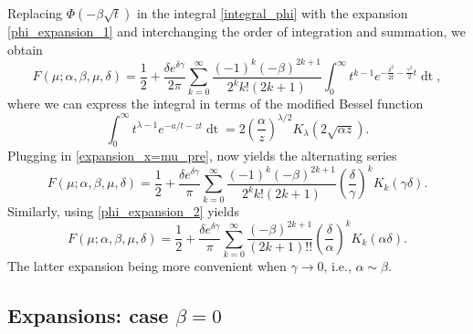 \documentclass[10pt,a4paper,oneside]{article}
\numberwithin{equation}{section}
\begin{document}
Replacing $\Phi(-\beta\sqrt{t})$ in the integral \eqref{integral_phi} with the expansion \eqref{phi_expansion_1} and interchanging the order of integration and summation, we obtain
\begin{equation}\label{expansion_x=mu_pre}
F(\mu; \alpha, \beta, \mu, \delta) = \frac{1}{2} + \frac{\delta e^{\delta \gamma}}{2\pi}\sum_{k=0}^{\infty}\frac{(-1)^k (-\beta)^{2k+1}}{2^k k! (2k+1)} \int_0^{\infty} t^{k - 1} e^{-\frac{\delta^2}{2t} - \frac{\gamma^2}{2}t} \mathop{dt},
\end{equation}
where we can express the integral in terms of the modified Bessel function
\begin{equation}\label{bessel_integral}
\int_0^{\infty} t^{\lambda - 1}e^{-a/t - zt} \mathop{dt} = 2\left(\frac{\alpha}{z}\right)^{\lambda/2} K_{\lambda}(2\sqrt{\alpha z}).
\end{equation}
Plugging in \eqref{expansion_x=mu_pre}, now yields the alternating series
\begin{equation}\label{series_x=mu_1}
F(\mu; \alpha, \beta, \mu, \delta) = \frac{1}{2} + \frac{\delta e^{\delta \gamma}}{\pi} \sum_{k=0}^{\infty} \frac{(-1)^k (-\beta)^{2k+1}}{2^k k! (2k + 1)} \left(\frac{\delta}{\gamma}\right)^k K_k(\gamma \delta).
\end{equation}
Similarly, using \eqref{phi_expansion_2} yields
\begin{equation}\label{series_x=mu_2}
F(\mu; \alpha, \beta, \mu, \delta) = \frac{1}{2} + \frac{\delta e^{\delta \gamma}}{\pi} \sum_{k=0}^{\infty} \frac{(-\beta)^{2k+1}}{(2k + 1)!!} \left(\frac{\delta}{\alpha}\right)^k K_k(\alpha \delta).
\end{equation}
The latter expansion being more convenient when $\gamma \to 0$, i.e., $\alpha \sim \beta$.

\subsection{Expansions: case $\beta = 0$}
\end{document}
